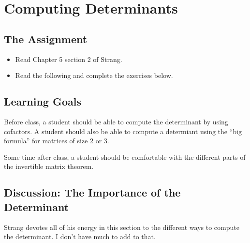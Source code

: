 \documentclass[10pt,]{book}
\theoremstyle{plain}
\theoremstyle{definition}
\numberwithin{equation}{section}
\begin{document}
\section[Computing Determinants]{Computing Determinants}\label{section-least-squares}
\typeout{************************************************}
\typeout{************************************************}
\subsection[The Assignment]{The Assignment}\label{subsection-120}
\begin{itemize}
\item{}Read Chapter 5 section 2 of Strang.\item{}Read the following and complete the exercises below.\end{itemize}
\typeout{************************************************}
\typeout{************************************************}
\subsection[Learning Goals]{Learning Goals}\label{subsection-121}
Before class, a student should be able to compute the determinant by using
      cofactors. A student should also be able to compute a determiant using the
      ``big formula'' for matrices of size 2 or 3.
\par

      Some time after class, a student should be comfortable with the different parts
      of the invertible matrix theorem.
\typeout{************************************************}
\typeout{************************************************}
\subsection[Discussion: The Importance of the Determinant]{Discussion: The Importance of the Determinant}\label{subsection-122}
Strang devotes all of his energy in this section to the different ways to
      compute the determinant. I don't have much to add to that.
\par
\end{document}
